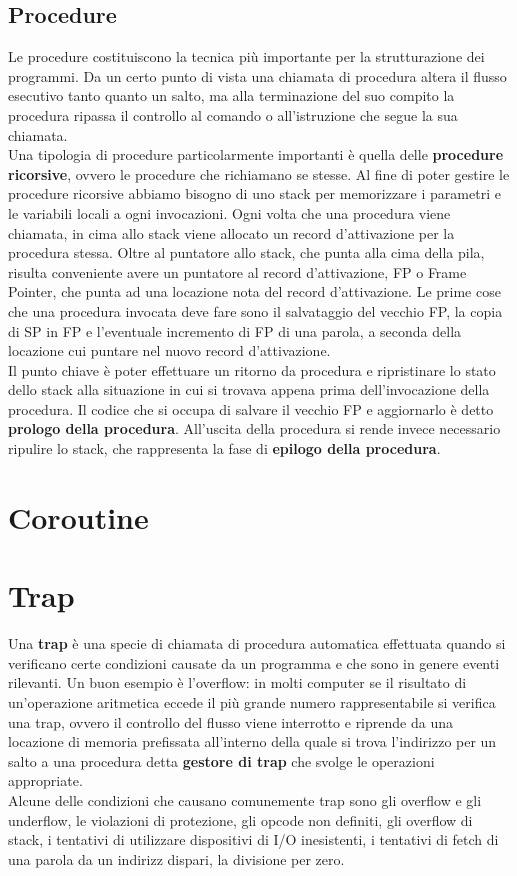 \documentclass[12pt]{report}
\begin{document}
		\subsection{Procedure}
		Le procedure costituiscono la tecnica più importante per la strutturazione dei programmi. Da un certo punto di vista una chiamata di procedura altera il flusso esecutivo tanto quanto un salto, ma alla terminazione del suo compito la procedura ripassa il controllo al comando o all'istruzione che segue la sua chiamata. \\
		Una tipologia di procedure particolarmente importanti è quella delle \textbf{procedure ricorsive}, ovvero le procedure che richiamano se stesse. Al fine di poter gestire le procedure ricorsive abbiamo bisogno di uno stack per memorizzare i parametri e le variabili locali a ogni invocazioni. Ogni volta che una procedura viene chiamata, in cima allo stack viene allocato un record d'attivazione per la procedura stessa. Oltre al puntatore allo stack, che punta alla cima della pila, risulta conveniente avere un puntatore al record d'attivazione, FP o Frame Pointer, che punta ad una locazione nota del record d'attivazione. Le prime cose che una procedura invocata deve fare sono il salvataggio del vecchio FP, la copia di SP in FP e l'eventuale incremento di FP di una parola, a seconda della locazione cui puntare nel nuovo record d'attivazione. \\
		Il punto chiave è poter effettuare un ritorno da procedura e ripristinare lo stato dello stack alla situazione in cui si trovava appena prima dell'invocazione della procedura. Il codice che si occupa di salvare il vecchio FP e aggiornarlo è detto \textbf{prologo della procedura}. All'uscita della procedura si rende invece necessario ripulire lo stack, che rappresenta la fase di \textbf{epilogo della procedura}.
		\section{Coroutine}
		\section{Trap}
		Una \textbf{trap} è una specie di chiamata di procedura automatica effettuata quando si verificano certe condizioni causate da un programma e che sono in genere eventi rilevanti. Un buon esempio è l'overflow: in molti computer se il risultato di un'operazione aritmetica eccede il più grande numero rappresentabile si verifica una trap, ovvero il controllo del flusso viene interrotto e riprende da una locazione di memoria prefissata all'interno della quale si trova l'indirizzo per un salto a una procedura detta \textbf{gestore di trap} che svolge le operazioni appropriate. \\
		Alcune delle condizioni che causano comunemente trap sono gli overflow e gli underflow, le violazioni di protezione, gli opcode non definiti, gli overflow di stack, i tentativi di utilizzare dispositivi di I/O inesistenti, i tentativi di fetch di una parola da un indirizz dispari, la divisione per zero.
\end{document}
